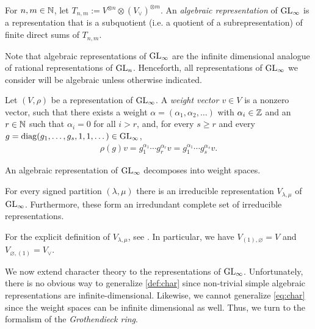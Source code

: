 \documentclass[11pt]{amsart}
\begin{document}
\begin{defin}
    For $n,m \in \mathbb{N}$, let $T_{n,m} := V^{\otimes n}\otimes (V_\vee)^{\otimes m}$. An \emph{algebraic representation} of $\mathrm{GL}_\infty$ is a representation that is a subquotient (i.e. a quotient of a subrepresentation) of finite direct sums of $T_{n,m}$.
\end{defin}

Note that algebraic representations of $\mathrm{GL}_\infty$ are the infinite dimensional analogue of rational representations of $\mathrm{GL}_n$. Henceforth, all representations of $\mathrm{GL}_\infty$ we consider will be algebraic unless otherwise indicated.

\begin{defin}
    Let $(V,\rho)$ be a representation of $\mathrm{GL}_\infty$. A \emph{weight vector $v \in  V$} is a nonzero vector, such that there exists a weight $\alpha = (\alpha_1, \alpha_2, \dots )$ with $\alpha_i \in \mathbb{Z}$  and an $r \in \mathbb{N}$ such that $\alpha_i = 0 $ for all $i > r$, and, for every $s\geq r$ and every $g = \operatorname{diag}(g_1, \dots, g_s, 1, 1 , \dots)\in\mathrm{GL}_\infty$, 
    \begin{align*}
        \rho(g) v = g_1 ^{\alpha_1} \cdots g_r^{\alpha_r} v=g_1^{\alpha_1}\cdots g_s^{\alpha_s} v.
    \end{align*}
\end{defin}

\begin{prop}[{\cite[\S 3.1.7]{SS15}}]
    An algebraic representation of $\mathrm{GL}_\infty$ decomposes into weight spaces.
\end{prop}

\begin{prop}[{\cite[Prop. 3.1.4]{SS15}}]
    For every signed partition \((\lambda,\mu)\) there is an irreducible representation \(V_{\lambda,\mu}\) of \(\mathrm{GL}_\infty\). Furthermore, these form an irredundant complete set of irreducible representations.
\end{prop}

For the explicit definition of \(V_{\lambda,\mu}\), see \cite[\S 3.1.2]{SS15}. In particular, we have \(V_{(1),\varnothing} = V\) and \(V_{\varnothing,(1)} = V_\vee\).

We now extend character theory to the representations of \(\mathrm{GL}_\infty\). Unfortunately, there is no obvious way to generalize \cref{def:char} since non-trivial simple algebraic representations are infinite-dimensional. Likewise, we cannot generalize \cref{eq:char} since the weight spaces can be infinite dimensional as well. Thus, we turn to the formalism of the \textit{Grothendieck ring}.
\end{document}
